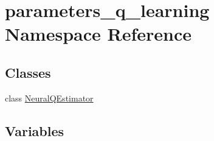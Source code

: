 \hypertarget{namespaceparameters__q__learning}{}\section{parameters\+\_\+q\+\_\+learning Namespace Reference}
\label{namespaceparameters__q__learning}
\subsection*{Classes}
\begin{DoxyCompactItemize}
\item 
class \hyperlink{classparameters__q__learning_1_1_neural_q_estimator}{Neural\+Q\+Estimator}
\end{DoxyCompactItemize}
\subsection*{Variables}

